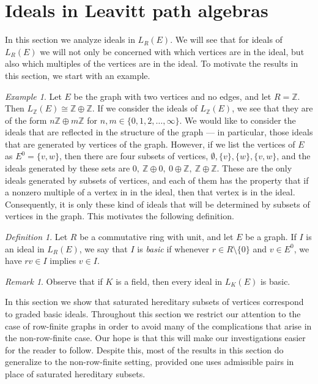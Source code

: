 \documentclass[11pt]{amsart}
\theoremstyle{remark}
\newtheorem{remark}[theorem]{Remark}
\newtheorem{definition}[theorem]{Definition}
\newtheorem{example}[theorem]{Example}
\numberwithin{equation}{section}
\newcommand{\Z}{\mathbb{Z}}
\begin{document}
\section{Ideals in Leavitt path algebras} \label{Ideals-sec}

In this section we analyze ideals in $L_R(E)$.  We will see that for ideals of $L_R(E)$ we will not only be concerned with which vertices are in the ideal, but also which multiples of the vertices are in the ideal.  To motivate the results in this section, we start with an example.  

\begin{example}
Let $E$ be the graph with two vertices and no edges, and let $R = \Z$.  Then $L_\Z(E) \cong \Z \oplus \Z$.  If we consider the ideals of $L_\Z(E)$, we see that they are of the form $n \Z \oplus m \Z$ for $n, m \in \{0, 1, 2, \ldots, \infty \}$.  We would like to consider the ideals that are reflected in the structure of the graph --- in particular, those ideals that are generated by vertices of the graph.  However, if we list the vertices of $E$ as $E^0 = \{v, w \}$, then there are four subsets of vertices, $\emptyset, \{ v \}, \{ w \}, \{v,w \}$, and the ideals generated by these sets are $0, \ \Z \oplus 0, \ 0 \oplus \Z, \ \Z \oplus \Z$.  These are the only ideals generated by subsets of vertices, and each of them has the property that if a nonzero multiple of a vertex in in the ideal, then that vertex is in the ideal.  Consequently, it is only these kind of ideals that will be determined by subsets of vertices in the graph.  This motivates the following definition.
\end{example}





\begin{definition}
Let $R$ be a commutative ring with unit, and let $E$ be a graph.  If $I$ is an ideal in $L_R(E)$, we say that $I$ is \emph{basic} if whenever $r \in R \setminus \{ 0 \}$ and $v \in E^0$, we have $rv \in I$ implies $v \in I$.
\end{definition}

\begin{remark}
Observe that if $K$ is a field, then every ideal in $L_K(E)$ is basic.
\end{remark}

In this section we show that saturated hereditary subsets of vertices correspond to graded basic ideals.  Throughout this section we restrict our attention to the case of row-finite graphs in order to  avoid many of the complications that arise in the non-row-finite case.  Our hope is that this will make our investigations easier for the reader to follow.  Despite this, most of the results in this section do generalize to the non-row-finite setting, provided one uses admissible pairs in place of saturated hereditary subsets.
\end{document}
